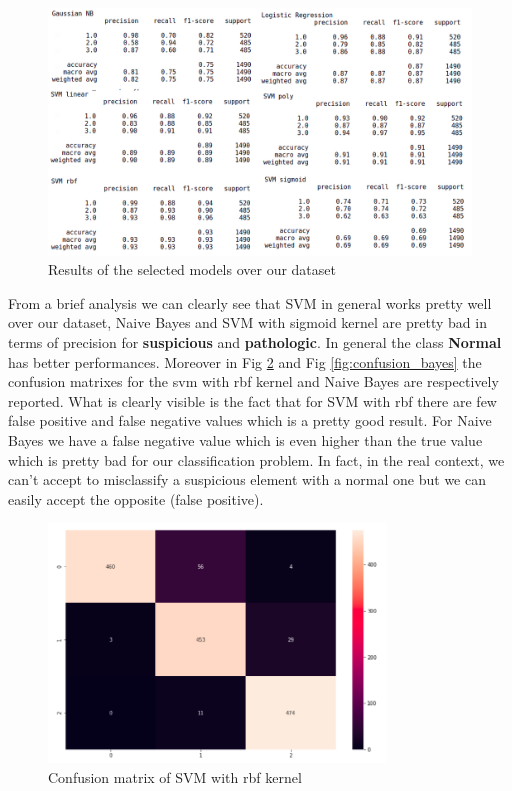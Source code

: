 \documentclass[a4paper,12pt]{article}
\begin{document}
\begin{figure}[H]
  \begin{center}
  \includegraphics[width=1.0\textwidth]{images/fulldataset.png}
  \end{center}
  \caption{Results of the selected models over our dataset}
  \label{fig:fulldataset}
\end{figure}

\noindent From a brief analysis we can clearly see that SVM in general works pretty well over our dataset, Naive Bayes and SVM with sigmoid kernel are pretty bad in terms of precision for \textbf{suspicious} and \textbf{pathologic}. In general the class \textbf{Normal} has better performances. Moreover in Fig \ref{fig:confusion_svm} and Fig \ref{fig:confusion_bayes} the confusion matrixes for the svm with rbf kernel and Naive Bayes are respectively reported. What is clearly visible is the fact that for SVM with rbf there are few false positive and false negative values which is a pretty good result. For Naive Bayes we have a false negative value which is even higher than the true value which is pretty bad for our classification problem. In fact, in the real context, we can't accept to misclassify a suspicious element with a normal one but we can easily accept the opposite (false positive).

\begin{figure}[H]
  \begin{center}
  \includegraphics[width=0.8\textwidth]{images/svm_rbf.png}
  \end{center}
  \caption{Confusion matrix of SVM with rbf kernel}
  \label{fig:confusion_svm}
\end{figure}
\end{document}
